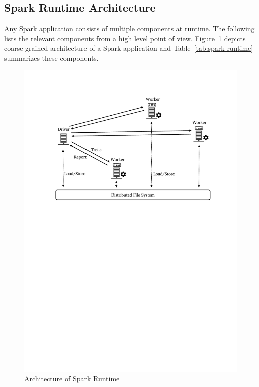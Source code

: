 \subsection{Spark Runtime Architecture}
\label{sp:run}
Any Spark application consists of multiple components at runtime. The following lists the relevant components from a high level point of view. Figure~\ref{fig:spark-runtime} depicts coarse grained architecture of a Spark application and Table~\ref{tab:spark-runtime} summarizes these components.
\begin{figure}[H]
    \centering
    \includegraphics[clip,trim=3cm 16.8cm 2.5cm 2.5cm,scale=0.7]{spark-high.pdf}
    \caption[Architecture of Spark Runtime]{Architecture of Spark Runtime\footnotemark}
    \label{fig:spark-runtime}
\end{figure}
